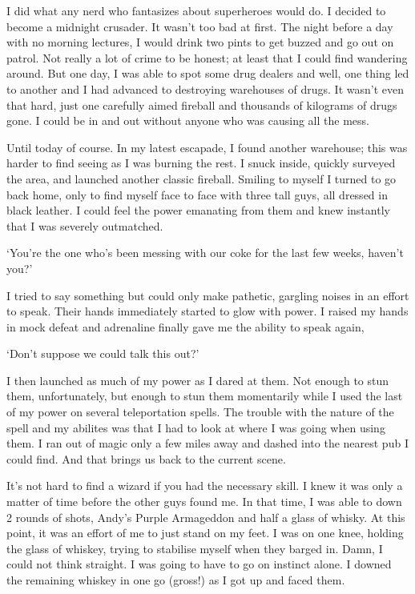 I did what any nerd who fantasizes about superheroes would do. I decided to become a midnight crusader. It wasn't too bad at first. The night before a day with no morning lectures, I would drink two pints to get buzzed and go out on patrol. Not really a lot of crime to be honest; at least that I could find wandering around. But one day, I was able to spot some drug dealers and well, one thing led to another and I had advanced to destroying warehouses of drugs. It wasn't even that hard, just one carefully aimed fireball and thousands of kilograms of drugs gone. I could be in and out without anyone who was causing all the mess.

Until today of course. In my latest escapade, I found another warehouse; this was harder to find seeing as I was burning the rest. I snuck inside, quickly surveyed the area, and launched another classic fireball. Smiling to myself I turned to go back home, only to find myself face to face with three tall guys, all dressed in black leather. I could feel the power emanating from them and knew instantly that I was severely outmatched.

`You're the one who's been messing with our coke for the last few weeks, haven't you?'

I tried to say something but could only make pathetic, gargling noises in an effort to speak. Their hands immediately started to glow with power. I raised my hands in mock defeat and adrenaline finally gave me the ability to speak again,

`Don't suppose we could talk this out?'

I then launched as much of my power as I dared at them. Not enough to stun them, unfortunately, but enough to stun them momentarily while I used the last of my power on several teleportation spells. The trouble with the nature of the spell and my abilites was that I had to look at where I was going when using them. I ran out of magic only a few miles away and dashed into the nearest pub I could find. And that brings us back to the current scene.

It's not hard to find a wizard if you had the necessary skill. I knew it was only a matter of time before the other guys found me. In that time, I was able to down 2 rounds of shots, Andy's Purple Armageddon and half a glass of whisky. At this point, it was an effort of me to just stand on my feet. I was on one knee, holding the glass of whiskey, trying to stabilise myself when they barged in. Damn, I could not think straight. I was going to have to go on instinct alone. I downed the remaining whiskey in one go (gross!) as I got up and faced them.


